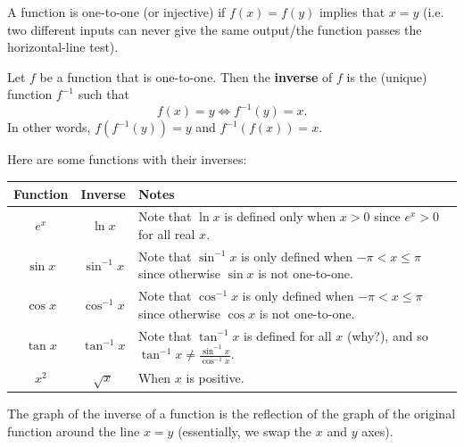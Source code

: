 


A function is one-to-one (or injective) if $ f(x) = f(y) $ implies that $ x = y $ (i.e. two different inputs can never
give the same output/the function passes the horizontal-line test).

\begin{defn}
  Let $ f $ be a function that is one-to-one. Then the \textbf{inverse} of $ f $ is the (unique) function $ f^{-1} $ such that
  \begin{displaymath}
    f(x) = y \iff f^{-1}(y) = x.
  \end{displaymath}
  In other words, $ f(f^{-1}(y)) = y $ and $ f^{-1}(f(x)) = x $.
\end{defn}

\begin{ex}
  Here are some functions with their inverses:
  \begin{center}
  \begin{tabularx}{0.7\linewidth}{c|c|X}
    \textbf{Function} & \textbf{Inverse} & \textbf{Notes}\\\hline
    $ e^x $ & $ \ln x $ & Note that $ \ln x $ is defined only when $ x > 0 $ since $ e^x > 0 $ for all real $ x $.\\
    $ \sin x $ & $ \sin^{-1} x $ & Note that $ \sin^{-1} x $ is only defined when $ -\pi < x \leq \pi $ since otherwise $ \sin x $ is not one-to-one.\\
    $ \cos x $ & $ \cos^{-1} x $ & Note that $ \cos^{-1} x $ is only defined when $ -\pi < x \leq \pi $ since otherwise $ \cos x $ is not one-to-one.\\
    $ \tan x $ & $ \tan^{-1} x $ & Note that $ \tan^{-1} x $ is defined for all $ x $ (why?), and so $ \tan^{-1} x \neq \frac{\sin^{-1} x}{\cos^{-1} x} $.\\
    $ x^2 $ & $ \sqrt{x} $ & When $ x $ is positive.
  \end{tabularx}
  \end{center}
\end{ex}
The graph of the inverse of a function is the reflection of the graph of the original function around the line $ x = y $ (essentially, we swap
the $ x $ and $ y $ axes).

